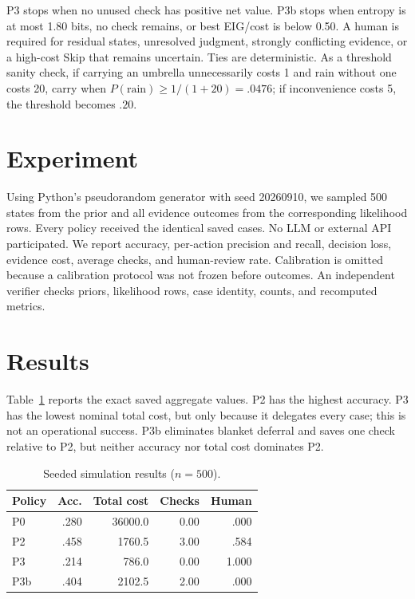 \documentclass{article}
\begin{document}
P3 stops when no unused check has positive net value. P3b stops when entropy is at most 1.80 bits, no check remains, or best EIG/cost is below 0.50. A human is required for residual states, unresolved judgment, strongly conflicting evidence, or a high-cost Skip that remains uncertain. Ties are deterministic. As a threshold sanity check, if carrying an umbrella unnecessarily costs 1 and rain without one costs 20, carry when $P(\mathrm{rain})\geq1/(1+20)=.0476$; if inconvenience costs 5, the threshold becomes $.20$.

\section{Experiment}
Using Python's pseudorandom generator with seed 20260910, we sampled 500 states from the prior and all evidence outcomes from the corresponding likelihood rows. Every policy received the identical saved cases. No LLM or external API participated. We report accuracy, per-action precision and recall, decision loss, evidence cost, average checks, and human-review rate. Calibration is omitted because a calibration protocol was not frozen before outcomes. An independent verifier checks priors, likelihood rows, case identity, counts, and recomputed metrics.

\section{Results}
Table~\ref{tab:results} reports the exact saved aggregate values. P2 has the highest accuracy. P3 has the lowest nominal total cost, but only because it delegates every case; this is not an operational success. P3b eliminates blanket deferral and saves one check relative to P2, but neither accuracy nor total cost dominates P2.

\begin{table}[t]
\centering
\caption{Seeded simulation results ($n=500$).}
\label{tab:results}
\begin{tabular}{lrrrr}
\toprule
Policy & Acc. & Total cost & Checks & Human \\
\midrule
P0 & .280 & 36000.0 & 0.00 & .000 \\
P2 & .458 & 1760.5 & 3.00 & .584 \\
P3 & .214 & 786.0 & 0.00 & 1.000 \\
P3b & .404 & 2102.5 & 2.00 & .000 \\
\bottomrule
\end{tabular}
\end{table}
\end{document}
